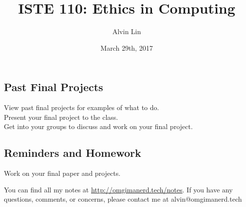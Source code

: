 \documentclass[letterpaper, 12pt]{article}
\title{ISTE 110: Ethics in Computing}
\author{Alvin Lin}
\date{March 29th, 2017}
\begin{document}
\maketitle

\subsection*{Past Final Projects}
View past final projects for examples of what to do. \\
Present your final project to the class. \\
Get into your groups to discuss and work on your final project.

\subsection*{Reminders and Homework}
Work on your final paper and projects.

\begin{center}
  You can find all my notes at \url{http://omgimanerd.tech/notes}. If you have
  any questions, comments, or concerns, please contact me at
  alvin@omgimanerd.tech
\end{center}
\end{document}

